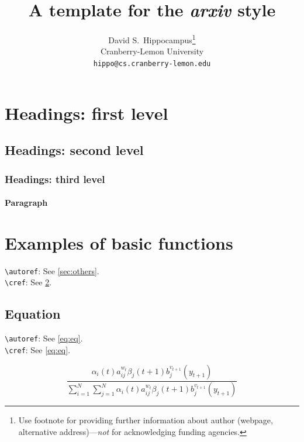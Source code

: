 \documentclass[twocolumn]{article}
\title{A template for the \emph{arxiv} style}
\author{%
  \large{David S.~Hippocampus\thanks{Use footnote for providing further information
    about author (webpage, alternative address)---\emph{not} for acknowledging
    funding agencies.} } \vspace{0.6em} \\
  \small{Cranberry-Lemon University} \\
  \texttt{hippo@cs.cranberry-lemon.edu} \\
}
\theoremstyle{definition}
\theoremstyle{remark}
\begin{document}
\maketitle

\begin{abstract}
	\lipsum[1]
\end{abstract}




\section{Headings: first level}

\lipsum[2]

\subsection{Headings: second level}
\lipsum[3]

\subsubsection{Headings: third level}
\lipsum[4]

\paragraph{Paragraph}
\lipsum[5]



\section{Examples of basic functions}
\label{sec:others}

\verb+\autoref+: See \autoref{sec:others}. \\
\verb+\cref+: See \cref{sec:others}. 

\subsection{Equation}

\verb+\autoref+: See \autoref{eq:eq}. \\
\verb+\cref+: See \cref{eq:eq}. 

\begin{equation}
{\frac {\alpha _{i}(t)a^{w_t}_{ij}\beta _{j}(t+1)b^{v_{t+1}}_{j}(y_{t+1})}{\sum _{i=1}^{N} \sum _{j=1}^{N} \alpha _{i}(t)a^{w_t}_{ij}\beta _{j}(t+1)b^{v_{t+1}}_{j}(y_{t+1})}}
    \label{eq:eq}
\end{equation}
\end{document}
